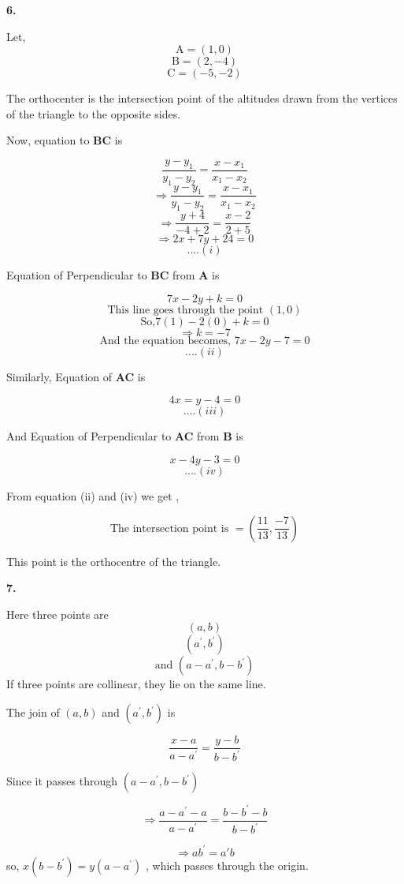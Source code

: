 \documentclass{article}
\begin{document}
\begin{flushleft}
\textbf{6.}\par
\vspace{0.5cm}
Let, 
\[ \text{A}=(1,0) \]
\[ \text{B}=(2,-4) \]
\[ \text{C}=(-5,-2)\]\par
The orthocenter is the intersection point of the altitudes drawn from the vertices of the triangle to the opposite sides.\par
\vspace{0.4cm}
Now, equation to \textbf{BC} is \par
\[\frac{y-y_1}{y_1-y_2}=\frac{x-x_1}{x_1-x_2}\]
\[\Longrightarrow\frac{y-y_1}{y_1-y_2}=\frac{x-x_1}{x_1-x_2}\]
\[\Longrightarrow\frac{y+4}{-4+2}=\frac{x-2}{2+5}\]
\[\Longrightarrow2x+7y+24=0\]
\[....(i)\]\par
Equation of Perpendicular to \textbf{BC} from \textbf{A} is\par
\[7x-2y+k=0\]
\[\text{This line goes through the point } (1,0)\]
\[\text{So,} 7(1)-2(0)+k=0\]
\[\Longrightarrow k=-7\]
\[\text{And the equation becomes, }7x-2y-7=0 \]
\[....(ii)\]\par
Similarly,
Equation of \textbf{AC} is \par
\[4x=y-4=0\]
\[....(iii)\]\par
And Equation of Perpendicular to \textbf{AC} from \textbf{B} is\par
\[x-4y-3=0\]
\[....(iv)\]\par
From equation (ii) and (iv) we get ,\par
\[\text{The intersection point is } = (\frac{11}{13} , \frac{-7}{13})\]\par
\vspace{0.5cm}
This point is the orthocentre of the triangle.\par
\newpage

\textbf{7.}\par
\vspace{0.5cm}
Here three points are
\[(a , b )\]
\[(a^{'} , b^{'})\]
\[\text{and }(a-a^{'},b-b^{'})\]
If three points are collinear, they lie on the same line.\par
\vspace{0.4cm}
The join of $(a , b)$ and $(a^{'},b^{'})$ is \par
\[ \frac{x-a}{a-a^{'}} = \frac{y-b}{b-b^{'}}\]\par
Since it passes through $(a-a^{'} , b-b^{'})$\par
\[\Longrightarrow\frac{a-a^{'}-a}{a-a^{'}}=\frac{b-b^{'}-b}{b-b^{'}}\] \par
\[\Longrightarrow ab^{'} = a{'}b\]
so, $x (b-b^{'}) = y (a-a^{'})$ , which passes through the origin.\par
\vspace{1cm}


\end{flushleft}
\end{document}
